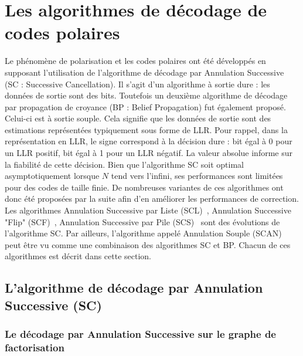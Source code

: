 \section{Les algorithmes de décodage de codes polaires}

Le phénomène de polarisation et les codes polaires ont été développés en supposant l'utilisation de l'algorithme de décodage par Annulation Successive (SC : Successive Cancellation). Il s'agit d'un algorithme à sortie dure : les données de sortie sont des bits. Toutefois un deuxième algorithme de décodage par propagation de croyance (BP : Belief Propagation) fut également proposé. Celui-ci est à sortie souple. Cela signifie que les données de sortie sont des estimations représentées typiquement sous forme de LLR. Pour rappel, dans la représentation en LLR, le signe correspond à la décision dure : bit égal à 0 pour un LLR positif, bit égal à 1 pour un LLR négatif. 
La valeur absolue informe sur la fiabilité de cette décision. Bien que l'algorithme SC soit optimal asymptotiquement lorsque $N$ tend vers l'infini, ses performances sont limitées pour des codes de taille finie. De nombreuses variantes de ces algorithmes ont donc été proposées par la suite afin d'en améliorer les performances de correction. Les algorithmes Annulation Successive par Liste (SCL)~\cite{tal_list_2011}, Annulation Successive "Flip" (SCF)~\cite{afisiadis_low-complexity_2014}, Annulation Successive par Pile (SCS)~\cite{niu_stack_2012} sont des évolutions de l'algorithme SC. Par ailleurs, l'algorithme appelé Annulation Souple (SCAN)~\cite{fayyaz_low-complexity_2014} peut être vu comme une combinaison des algorithmes SC et BP. Chacun de ces algorithmes est décrit dans cette section.

\subsection{L'algorithme de décodage par Annulation Successive (SC)}

\subsubsection{Le décodage par Annulation Successive sur le graphe de factorisation}

